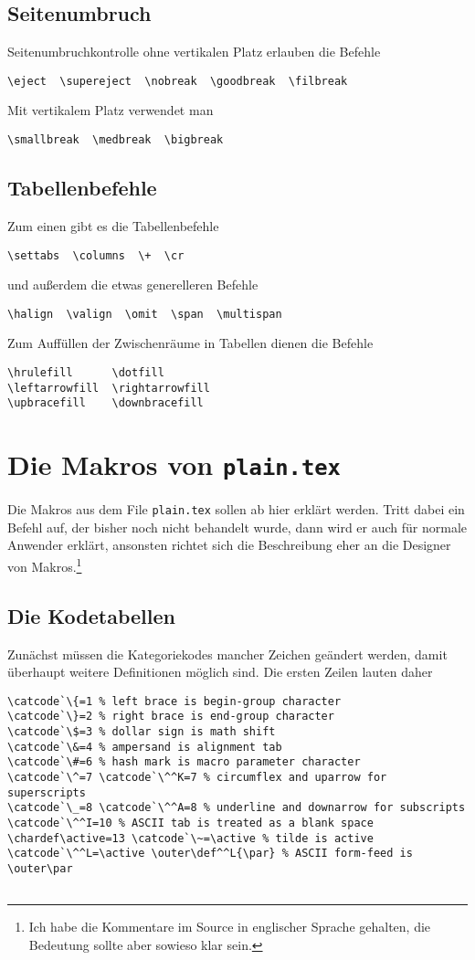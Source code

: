\begin{appendix}
\subsection{Seitenumbruch}
Seitenumbruchkontrolle ohne vertikalen Platz erlauben die Befehle
\begin{verbatim}
\eject  \supereject  \nobreak  \goodbreak  \filbreak
\end{verbatim}
Mit vertikalem Platz verwendet man
\begin{verbatim}
\smallbreak  \medbreak  \bigbreak
\end{verbatim}
\subsection{Tabellenbefehle}
Zum einen gibt es die Tabellenbefehle
\begin{verbatim}
\settabs  \columns  \+  \cr
\end{verbatim}
und au\ss{}erdem die etwas generelleren Befehle
\begin{verbatim}
\halign  \valign  \omit  \span  \multispan
\end{verbatim}
Zum Auff\"ullen der Zwischenr\"aume in Tabellen dienen die Befehle
\begin{verbatim}
\hrulefill      \dotfill
\leftarrowfill  \rightarrowfill
\upbracefill    \downbracefill
\end{verbatim}
\section{Die Makros von {\tt\bf plain.tex}}
Die Makros aus dem File {\tt plain.tex} sollen ab hier erkl\"art werden.
Tritt dabei ein Befehl auf, der bisher noch nicht behandelt wurde,
dann wird er auch f\"ur normale Anwender erkl\"art, ansonsten richtet sich
die Beschreibung eher an die Designer von Makros.\footnote{Ich habe
die Kommentare im Source in englischer Sprache gehalten, die Bedeutung
sollte aber sowieso klar sein.}
\subsection{Die Kodetabellen}
Zun\"achst m\"ussen die Kategoriekodes mancher Zeichen ge\"andert werden,
damit \"uberhaupt weitere Definitionen m\"oglich sind. Die ersten Zeilen
lauten daher
\begin{verbatim}
\catcode`\{=1 % left brace is begin-group character
\catcode`\}=2 % right brace is end-group character
\catcode`\$=3 % dollar sign is math shift
\catcode`\&=4 % ampersand is alignment tab
\catcode`\#=6 % hash mark is macro parameter character
\catcode`\^=7 \catcode`\^^K=7 % circumflex and uparrow for superscripts
\catcode`\_=8 \catcode`\^^A=8 % underline and downarrow for subscripts
\catcode`\^^I=10 % ASCII tab is treated as a blank space
\chardef\active=13 \catcode`\~=\active % tilde is active
\catcode`\^^L=\active \outer\def^^L{\par} % ASCII form-feed is \outer\par


\end{verbatim}
\end{appendix}
